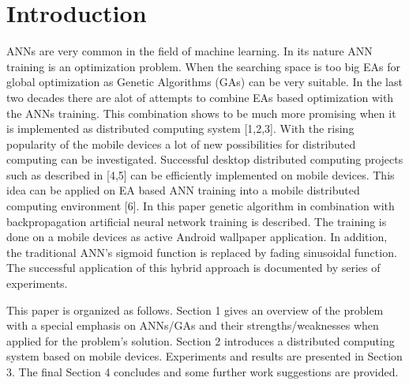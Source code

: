 \documentclass{llncs}
\begin{document}
\section{Introduction}
%
ANNs are very common in the field of machine learning. In its nature ANN training is an optimization problem. When the searching space is too big EAs for global optimization as Genetic Algorithms (GAs) can be very suitable. In the last two decades there are alot of attempts to combine EAs based optimization with the ANNs training. This combination shows to be much more promising when it is implemented as distributed computing system [1,2,3]. With the rising popularity of the mobile devices a lot of new possibilities for distributed computing can be investigated. Successful desktop distributed computing projects such as described in [4,5] can be efficiently implemented on mobile devices. This idea can be applied on EA based ANN training into a mobile distributed computing environment [6]. In this paper genetic algorithm in combination with backpropagation artificial neural network training is described. The training is done on a mobile devices as active Android wallpaper application. In addition, the traditional ANN's sigmoid function is replaced by fading sinusoidal function. The successful application of this hybrid approach is documented by series of experiments.

This paper is organized as follows. Section 1 gives an overview of the problem  with a special emphasis on ANNs/GAs and their strengths/weaknesses when applied for the problem's solution. Section 2 introduces a distributed computing system based on mobile devices. Experiments and results are presented in Section 3. The final Section 4 concludes and some further work suggestions are provided. 
%
\end{document}
